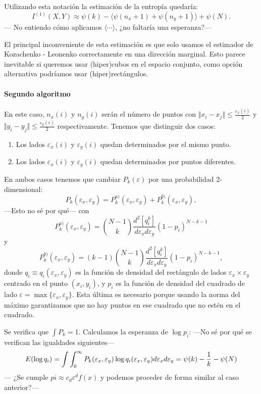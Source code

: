 \documentclass[10pt,a4paper]{article} %
\let\mathbb\relax
\theoremstyle{definition}
\begin{document}
Utilizando esta notación la estimación de la entropía quedaría:\[
I^{(1)}(X,Y) \approx \psi(k) - \langle \psi(n_x+1) + \psi(n_y+1) \rangle + \psi(N).
\]
--- No entiendo cómo aplicamos $\langle \cdots \rangle$, ¿no faltaría una esperanza?---

El principal inconveniente de esta estimación es que solo usamos el estimador de Kozachenko - Leonenko correctamente en una dirección marginal. Esto parece inevitable si queremos usar (hiper)cubos en el espacio conjunto, como opción alternativa podríamos usar (hiper)rectángulos.

\paragraph{Segundo algoritmo} En este caso, $n_x(i)$ y $n_y(i)$ serán el número de puntos con $\Vert x_i - x_j \Vert \leq \frac{\varepsilon_x(i)}{2}$ y $\Vert y_i - y_j \Vert \leq \frac{\varepsilon_y(i)}{2}$ respectivamente. Tenemos que distinguir dos casos:

\begin{enumerate}[label={\alph*)}]
\item Los lados $\varepsilon_x(i)$ y $\varepsilon_y(i)$ quedan determinados por el mismo punto.
\item Los lados $\varepsilon_x(i)$ y $\varepsilon_y(i)$ quedan determinados por puntos diferentes.
\end{enumerate}

En ambos casos tenemos que cambiar $P_k(\varepsilon)$ por una probabilidad 2-dimensional:\[
P_k(\varepsilon_x, \varepsilon_y) = P_k^{a)}(\varepsilon_x, \varepsilon_y) + P_k^{b)}(\varepsilon_x, \varepsilon_y),
\]
---Esto no sé por qué---
con \[
P_k^{a)}(\varepsilon_x, \varepsilon_y) = \binom{N-1}{k} \frac{d^2[q_i^k]}{d\varepsilon_x d \varepsilon_y}(1-p_i)^{N-k-1}
\]
y\[
P_k^{b)}(\varepsilon_x, \varepsilon_y) = (k-1)\binom{N-1}{k} \frac{d^2[q_i^k]}{d\varepsilon_x d \varepsilon_y}(1-p_i)^{N-k-1},
\]
donde $q_i \equiv q_i(\varepsilon_x, \varepsilon_y)$ es la función de densidad del rectángulo de lados $\varepsilon_x \times \varepsilon_y$ centrado en el punto $(x_i, y_i)$, y $p_i$ es la función de densidad del cuadrado de lado $\varepsilon = \max \{\varepsilon_x, \varepsilon_y\}$. Esta última es necesario porque usando la norma del máximo garantizamos que no hay puntos en ese cuadrado que no estén en el cuadrado.

Se verifica que $\int P_k =1$. Calculamos la esperanza de $\log p_i$:
---No sé por qué se verifican las igualdades siguientes---
\[
\mathbb{E}(\log q_i) = \int \int_0^{\infty} P_k(\varepsilon_x, \varepsilon_y) \log q_i(\varepsilon_x, \varepsilon_y) d \varepsilon_x d\varepsilon_y
= \psi(k) - \frac{1}{k} - \psi(N)
\]
--- ¿Se cumple $pi\approx c_d\varepsilon^df(x)$ y podemos proceder de forma similar al caso anterior?---
\end{document}

